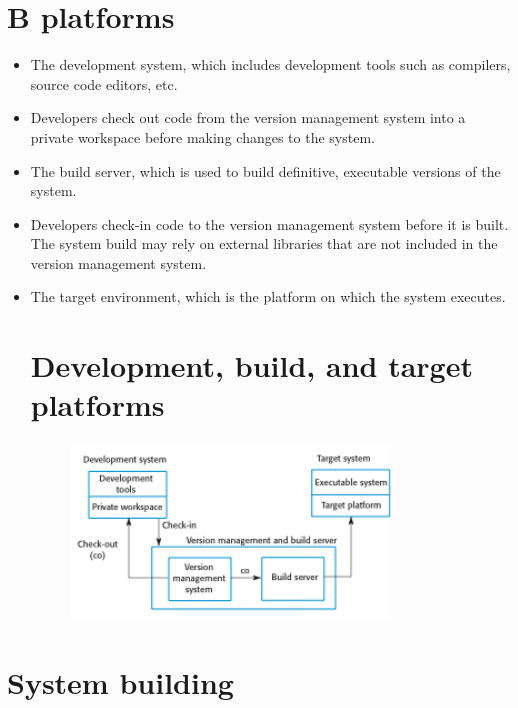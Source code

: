 \section{B platforms}
\begin{itemize}
\item The development system, which includes development tools such as compilers, source code editors, etc.

   \item Developers check out code from the version management system into a private workspace before making changes to the system.

\item The build server, which is used to build definitive, executable versions of the system.

   \item Developers check-in code to the version management system before it is built. The system build may rely on external libraries that are not included in the version management system.

\item The target environment, which is the platform on which the system executes.
\newpage
\section{Development, build, and target platforms}
\begin{figure}[h!]
    \centering
    \includegraphics[width = 0.8\textwidth]{./figures/L8_7.png}
    \caption{}
    \label{fig:L8_7}
\end{figure}



\end{itemize}
\section{System building}

